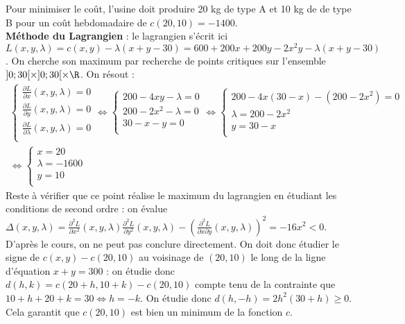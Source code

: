 \begin{enumerate}
{\begin{itemize}
\begin{itemize}
				Pour minimiser le coût, l'usine doit produire 20 kg de type A et 10 kg de de type B pour un coût hebdomadaire de $c(20,10) = -1400$.  \\
				\textbf{Méthode du Lagrangien} : le lagrangien s'écrit ici $L(x,y,\lambda) = c(x,y)-\lambda(x+y-30) = 600+200x+200y-2x^2y-\lambda(x+y-30)$. On cherche son maximum par recherche de points critiques sur l'ensemble $]0;30[\times]0;30[\times\R$. On résout :
				\begin{align*}
					\begin{cases}
						\frac{\partial L}{\partial x}(x,y,\lambda) = 0\\
						\frac{\partial L}{\partial y}(x,y,\lambda) = 0\\
						\frac{\partial L}{\partial \lambda}(x,y,\lambda) = 0\\
					\end{cases}
					\Leftrightarrow
					\begin{cases}
						200-4xy-\lambda = 0\\
						200-2x^2-\lambda = 0\\
						30-x-y = 0\\
					\end{cases}
					\Leftrightarrow
					\begin{cases}
						200-4x(30-x)-(200-2x^2) = 0\\
						\lambda = 200-2x^2\\
						y= 30-x\\
					\end{cases} \\
					\Leftrightarrow \begin{cases}
						x = 20\\
						\lambda = -1600\\
						y= 10\\
					\end{cases}
				\end{align*}
				Reste à vérifier que ce point réalise le maximum du lagrangien en étudiant les conditions de second ordre : on évalue $\Delta(x,y,\lambda) = \frac{\partial^2 L}{\partial x^2}(x,y,\lambda)\frac{\partial^2 L}{\partial y^2}(x,y,\lambda) - \left(\frac{\partial^2 L}{\partial x \partial y}(x,y,\lambda) \right)^2 = -16x^2<0$. D'après le cours, on ne peut pas conclure directement. On doit donc étudier le signe de $c(x,y)-c(20,10)$ au voisinage de $(20,10)$ le long de la ligne d'équation $x+y=300$ : on étudie donc $d(h,k)=c(20+h,10+k)-c(20,10)$ compte tenu de la contrainte que $10+h+20+k = 30 \iff h=-k$. On étudie donc $d(h,-h) =  2h^2(30+h) \geq 0$. Cela garantit que $c(20,10)$ est bien un minimum de la fonction $c$.
			\end{itemize}
		\end{itemize}
		
	}
\end{enumerate}